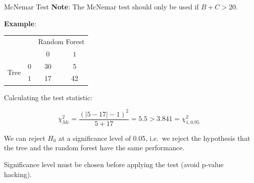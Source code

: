 \begin{frame}[c,allowframebreaks]{McNemar Test}
    \textbf{Note}: The McNemar test should only be used if $B + C > 20$.

    \framebreak

    \textbf{Example}:

    \begin{center}
      \begin{tabular}{cc|cc}
          & & \multicolumn{2}{c}{Random Forest} \\
          & & $0$ & $1$ \\
          \hline
          \multirow{2}{*}{Tree} & $0$ & 30 & 5 \\
          & $1$ & 17 & 42 \\
      \end{tabular}
    \end{center}

    Calculating the test statistic:

    $$\chi^2_{Mc} =  \frac{(|5-17| - 1)^2}{5 + 17} = 5.5 > 3.841 = \chi^2_{1,0.95}$$

    We can reject $H_0$ at a significance level of 0.05, i.e.\ we reject the hypothesis that the tree and the random forest have the same performance.

    Significance level must be chosen before applying the test (avoid p-value
    hacking).
    \end{frame}


